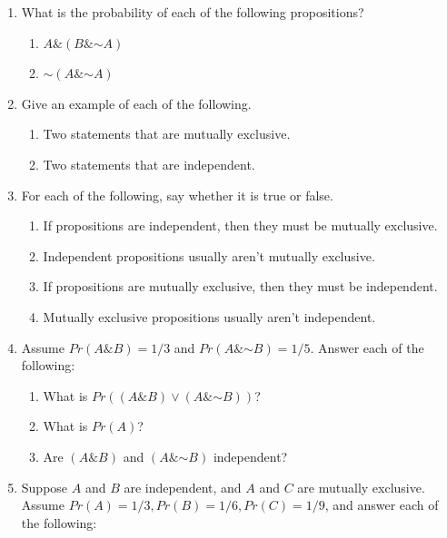 \documentclass[justified]{tufte-book}
\providecommand{\tightlist}{%
  \setlength{\itemsep}{0pt}\setlength{\parskip}{0pt}}
\renewcommand{\neg}{\mathbin{\sim}}
\renewcommand{\wedge}{\mathbin{\&}}
\newcommand{\p}{Pr}
\theoremstyle{definition}
\theoremstyle{definition}
\theoremstyle{definition}
\theoremstyle{definition}
\theoremstyle{remark}
\begin{document}
\begin{enumerate}
\item
  What is the probability of each of the following propositions?

  \begin{enumerate}
  \def\labelenumii{\alph{enumii}.}
  \tightlist
  \item
    \(A \wedge (B \wedge \neg A)\)
  \item
    \(\neg (A \wedge \neg A)\)
  \end{enumerate}
\item
  Give an example of each of the following.

  \begin{enumerate}
  \def\labelenumii{\alph{enumii}.}
  \tightlist
  \item
    Two statements that are mutually exclusive.
  \item
    Two statements that are independent.
  \end{enumerate}
\item
  For each of the following, say whether it is true or false.

  \begin{enumerate}
  \def\labelenumii{\alph{enumii}.}
  \tightlist
  \item
    If propositions are independent, then they must be mutually exclusive.
  \item
    Independent propositions usually aren't mutually exclusive.
  \item
    If propositions are mutually exclusive, then they must be independent.
  \item
    Mutually exclusive propositions usually aren't independent.
  \end{enumerate}
\item
  Assume \(Pr(A \wedge B)=1/3\) and \(Pr(A \wedge \neg B)=1/5\). Answer each of the following:

  \begin{enumerate}
  \def\labelenumii{\alph{enumii}.}
  \tightlist
  \item
    What is \(Pr((A \wedge B) \vee (A \wedge \neg B))\)?
  \item
    What is \(Pr(A)\)?
  \item
    Are \((A \wedge B)\) and \((A \wedge \neg B)\) independent?
  \end{enumerate}
\item
  Suppose \(A\) and \(B\) are independent, and \(A\) and \(C\) are mutually exclusive. Assume \(\p(A) = 1/3, \p(B) = 1/6, \p(C) = 1/9\), and answer each of the following:


\end{enumerate}
\end{document}
